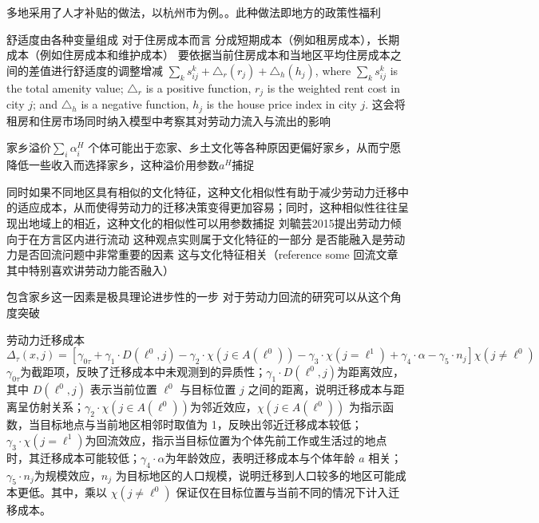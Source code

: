 \documentclass[a4paper,12pt,oneside]{book} %
\begin{document}
多地采用了人才补贴的做法，以杭州市为例。。此种做法即地方的政策性福利

舒适度由各种变量组成
对于住房成本而言
分成短期成本（例如租房成本），长期成本（例如住房成本和维护成本）
要依据当前住房成本和当地区平均住房成本之间的差值进行舒适度的调整增减
$\sum\limits_{k}s^k_{ij}+\triangle_r(r_j)+\triangle_h(h_j)$, where $\sum\limits_{k}s^k_{ij}$ is the total amenity value; $\triangle_r$ is a positive function, $r_j$ is the weighted rent cost in city $j$; and $\triangle_h$ is a negative function, $h_j$ is the house price index in city $j$.
这会将租房和住房市场同时纳入模型中考察其对劳动力流入与流出的影响


家乡溢价$\sum\limits_{i}\alpha^{H}_{i}$
个体可能出于恋家、乡土文化等各种原因更偏好家乡，从而宁愿降低一些收入而选择家乡，这种溢价用参数$a^H$捕捉

同时如果不同地区具有相似的文化特征，这种文化相似性有助于减少劳动力迁移中的适应成本，从而使得劳动力的迁移决策变得更加容易；同时，这种相似性往往呈现出地域上的相近，这种文化的相似性可以用参数捕捉
刘毓芸2015提出劳动力倾向于在方言区内进行流动 这种观点实则属于文化特征的一部分
是否能融入是劳动力是否回流问题中非常重要的因素 这与文化特征相关（reference some 回流文章 其中特别喜欢讲劳动力能否融入）

包含家乡这一因素是极具理论进步性的一步 对于劳动力回流的研究可以从这个角度突破

劳动力迁移成本
\begin{equation}
  \Delta_\tau(x, j) = [\gamma_{0 \tau}+\gamma_1 \cdot D(\ell^0,j)-\gamma_2 \cdot\chi(j\in A(\ell^0))-\gamma_3 \cdot\chi(j=\ell^1)+\gamma_4 \cdot\alpha-\gamma_5 \cdot n_j]\chi(j\neq \ell^0)
\end{equation}
$\gamma_{0 \tau}$为截距项，反映了迁移成本中未观测到的异质性；$\gamma_1 \cdot D(\ell^0,j)$为距离效应，其中 $D(\ell^0, j)$ 表示当前位置 $\ell^0$ 与目标位置 $j$ 之间的距离，说明迁移成本与距离呈仿射关系；$\gamma_2 \cdot \chi(j\in A(\ell^0))$为邻近效应，$\chi(j\in A(\ell^0))$ 为指示函数，当目标地点与当前地区相邻时取值为 1，反映出邻近迁移成本较低；$\gamma_3 \cdot \chi(j=\ell^1)$为回流效应，指示当目标位置为个体先前工作或生活过的地点时，其迁移成本可能较低；$\gamma_4 \cdot \alpha$为年龄效应，表明迁移成本与个体年龄 $a$ 相关；$\gamma_5 \cdot n_j$为规模效应，$n_j$ 为目标地区的人口规模，说明迁移到人口较多的地区可能成本更低。其中，乘以 $\chi(j\neq \ell^0)$ 保证仅在目标位置与当前不同的情况下计入迁移成本。
\end{document}
